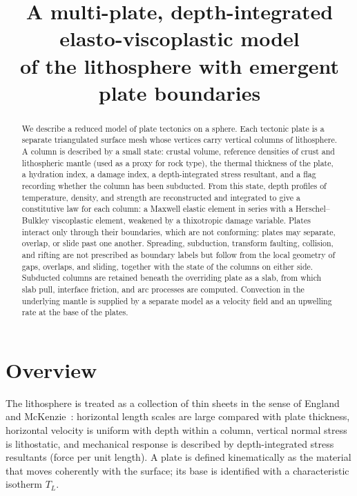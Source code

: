 \documentclass[11pt]{article}
\title{A multi-plate, depth-integrated elasto-viscoplastic model\\
of the lithosphere with emergent plate boundaries}
\author{}
\date{}
\begin{document}
\maketitle

\begin{abstract}
We describe a reduced model of plate tectonics on a sphere. Each tectonic plate
is a separate triangulated surface mesh whose vertices carry vertical columns of
lithosphere. A column is described by a small state: crustal volume, reference
densities of crust and lithospheric mantle (used as a proxy for rock type), the
thermal thickness of the plate, a hydration index, a damage index, a
depth-integrated stress resultant, and a flag recording whether the column has
been subducted. From this state, depth profiles of temperature, density, and
strength are reconstructed and integrated to give a constitutive law for each
column: a Maxwell elastic element in series with a Herschel--Bulkley
viscoplastic element, weakened by a thixotropic damage variable. Plates interact
only through their boundaries, which are not conforming: plates may separate,
overlap, or slide past one another. Spreading, subduction, transform faulting,
collision, and rifting are not prescribed as boundary labels but follow from
the local geometry of gaps, overlaps, and sliding, together with the state of
the columns on either side. Subducted columns are retained beneath the
overriding plate as a slab, from which slab pull, interface friction, and arc
processes are computed. Convection in the underlying mantle is supplied by a
separate model as a velocity field and an upwelling rate at the base of the
plates.
\end{abstract}

\tableofcontents

\section{Overview}

The lithosphere is treated as a collection of thin sheets in the sense of
England and McKenzie~\cite{EnglandMcKenzie1982}: horizontal length scales are
large compared with plate thickness, horizontal velocity is uniform with depth
within a column, vertical normal stress is lithostatic, and mechanical response
is described by depth-integrated stress resultants (force per unit length). A
plate is defined kinematically as the material that moves coherently with the
surface; its base is identified with a characteristic isotherm $T_L$.
\end{document}
